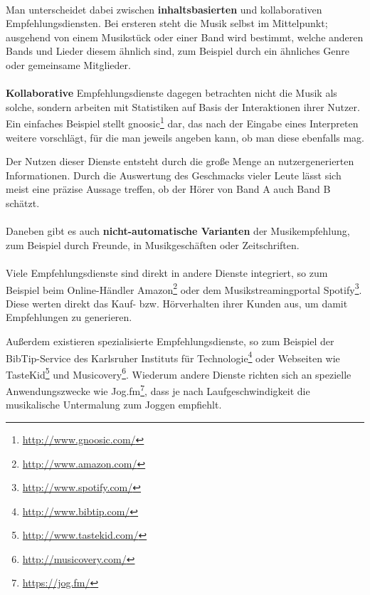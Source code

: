\paragraph{} Man unterscheidet dabei zwischen \textbf{inhaltsbasierten} und kollaborativen Empfehlungsdiensten. Bei ersteren steht die Musik selbst im Mittelpunkt; ausgehend von einem Musikstück oder einer Band wird bestimmt, welche anderen Bands und Lieder diesem ähnlich sind, zum Beispiel durch ein ähnliches Genre oder gemeinsame Mitglieder.

\paragraph{} \textbf{Kollaborative} Empfehlungsdienste dagegen betrachten nicht die Musik als solche, sondern arbeiten mit Statistiken auf Basis der Interaktionen ihrer Nutzer. Ein einfaches Beispiel stellt gnoosic\footnote{\url{http://www.gnoosic.com/}} dar, das nach der Eingabe eines Interpreten weitere vorschlägt, für die man jeweils angeben kann, ob man diese ebenfalls mag. 

Der Nutzen dieser Dienste entsteht durch die große Menge an nutzergenerierten Informationen. Durch die Auswertung des Geschmacks vieler Leute lässt sich meist eine präzise Aussage treffen, ob der Hörer von Band A auch Band B schätzt.

\paragraph{} Daneben gibt es auch \textbf{nicht-automatische Varianten} der Musikempfehlung, zum Beispiel durch Freunde, in Musikgeschäften oder Zeitschriften.

\paragraph{} Viele Empfehlungsdienste sind direkt in andere Dienste integriert, so zum Beispiel beim Online-Händler Amazon\footnote{\url{http://www.amazon.com/}} oder dem Musikstreamingportal Spotify\footnote{\url{http://www.spotify.com/}}. Diese werten direkt das Kauf- bzw. Hörverhalten ihrer Kunden aus, um damit Empfehlungen zu generieren.  

Außerdem existieren spezialisierte Empfehlungsdienste, so zum Beispiel der BibTip-Service des Karlsruher Instituts für Technologie\footnote{\url{http://www.bibtip.com/}} oder Webseiten wie TasteKid\footnote{\url{http://www.tastekid.com/}} und Musicovery\footnote{\url{http://musicovery.com/}}. Wiederum andere Dienste richten sich an spezielle Anwendungszwecke wie Jog.fm\footnote{\url{https://jog.fm/}}, dass je nach Laufgeschwindigkeit die musikalische Untermalung zum Joggen empfiehlt.

